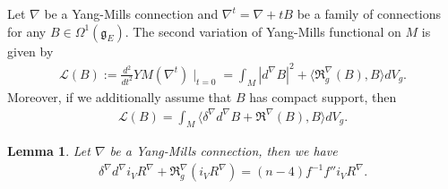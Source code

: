 \documentclass{amsart}
\newtheorem{lemma}{Lemma}[section]
\begin{document}
	Let $\nabla$ be a Yang-Mills connection and $\nabla^t=\nabla+tB$ be a family of connections for any $B\in\Omega^1(\mathfrak{g}_E)$. The second variation of Yang-Mills functional on $M$ is given by
	\begin{align*}
		\mathscr{L}(B):=\frac{d^2}{dt^2}YM(\nabla^t)\mid_{t=0}=\int_M|d^\nabla B|^2+\langle\mathfrak{R}^\nabla_g(B),B\rangle dV_g.
	\end{align*}
	Moreover, if we additionally assume that $B$ has compact support, then
	\begin{align*}
		\mathscr{L}(B)=\int_M\langle\delta^\nabla d^\nabla B+\mathfrak{R}^\nabla(B),B\rangle dV_g.
	\end{align*}
	\begin{lemma}\label{S(i_VR) in W-P}
		Let $\nabla$ be a Yang-Mills connection, then we have
		\begin{align*}
			\delta^\nabla d^\nabla i_VR^\nabla+\mathfrak{R}^\nabla_g(i_VR^\nabla)=(n-4)f^{-1}f''i_VR^\nabla.
		\end{align*}
	\end{lemma}
\end{document}
